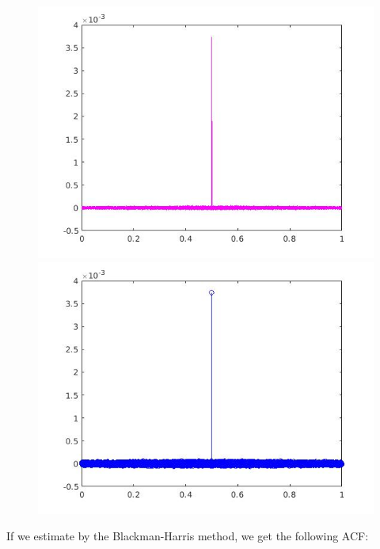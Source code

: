 \documentclass[a4paper,11pt]{article}
\begin{document}
\begin{figure}[!hp]
\centering
\begin{minipage}{.5\textwidth}
  \centering
  \includegraphics[width=1\linewidth]{images/lab1_38.jpg}
\end{minipage}%
\begin{minipage}{.5\textwidth}
  \centering
  \includegraphics[width=1\linewidth]{images/lab1_39.jpg}
\end{minipage}
\end{figure}

If we estimate by the Blackman-Harris method, we get the following ACF:
\end{document}
